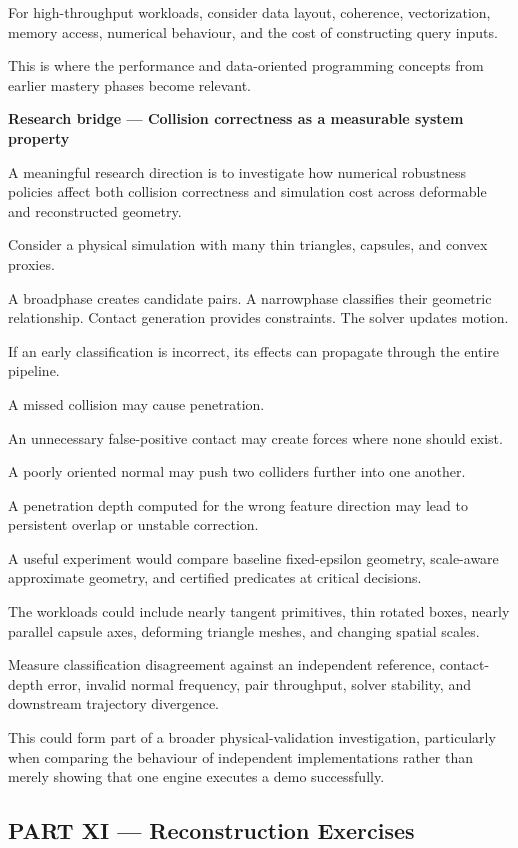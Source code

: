 For high-throughput workloads, consider data layout, coherence, vectorization, memory access, numerical behaviour, and the cost of constructing query inputs.

This is where the performance and data-oriented programming concepts from earlier mastery phases become relevant.

\textbf{Research bridge --- Collision correctness as a measurable system property}

A meaningful research direction is to investigate how numerical robustness policies affect both collision correctness and simulation cost across deformable and reconstructed geometry.

Consider a physical simulation with many thin triangles, capsules, and convex proxies.

A broadphase creates candidate pairs. A narrowphase classifies their geometric relationship. Contact generation provides constraints. The solver updates motion.

If an early classification is incorrect, its effects can propagate through the entire pipeline.

A missed collision may cause penetration.

An unnecessary false-positive contact may create forces where none should exist.

A poorly oriented normal may push two colliders further into one another.

A penetration depth computed for the wrong feature direction may lead to persistent overlap or unstable correction.

A useful experiment would compare baseline fixed-epsilon geometry, scale-aware approximate geometry, and certified predicates at critical decisions.

The workloads could include nearly tangent primitives, thin rotated boxes, nearly parallel capsule axes, deforming triangle meshes, and changing spatial scales.

Measure classification disagreement against an independent reference, contact-depth error, invalid normal frequency, pair throughput, solver stability, and downstream trajectory divergence.

This could form part of a broader physical-validation investigation, particularly when comparing the behaviour of independent implementations rather than merely showing that one engine executes a demo successfully.

\subsection{PART XI --- Reconstruction Exercises}\label{04-visual-computing-ii-ch025-part-xi-reconstruction-exercises}

